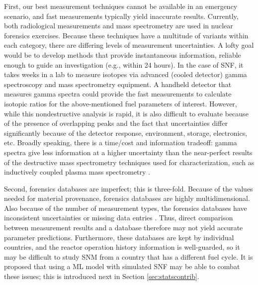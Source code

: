 First, our best measurement techniques cannot be available in an emergency
scenario, and fast measurements typically yield inaccurate results.  Currently,
both radiological measurements and mass spectrometry are used in nuclear
forensics exercises.  Because these techniques have a multitude of variants
within each category, there are differing levels of measurement uncertainties.
A lofty goal would be to develop methods that provide instantaneous
information, reliable enough to guide an investigation (e.g., within 24 hours).
In the case of \gls{SNF}, it takes weeks in a lab to measure isotopes via
advanced (cooled detector) gamma spectroscopy and mass spectrometry equipment.
A handheld detector that measures gamma spectra could provide the fast
measurements to calculate isotopic ratios for the above-mentioned fuel
parameters of interest.  However, while this nondestructive analysis is rapid,
it is also difficult to evaluate because of the presence of overlapping peaks
and the fact that uncertainties differ significantly because of the detector
response, environment, storage, electronics, etc. Broadly speaking, there is a
time/cost and information tradeoff: gamma spectra give less information at a
higher uncertainty than the near-perfect results of the destructive mass
spectrometry techniques used for characterization, such as inductively coupled
plasma mass spectrometry \cite{iaea_nf}.

Second, forensics databases are imperfect; this is three-fold.  Because of the
values needed for material provenance, forensics databases are highly
multidimensional. Also because of the number of measurement types, the
forensics databases have inconsistent uncertainties or missing data entries
\cite{nf_missingdata}.  Thus, direct comparison between measurement results and
a database therefore may not yield accurate parameter predictions.
Furthermore, these databases are kept by individual countries, and the reactor
operation history information is well-guarded, so it may be difficult to study
\gls{SNM} from a country that has a different fuel cycle.  It is proposed that
using a \gls{ML} model with simulated \gls{SNF} may be able to combat
these issues; this is introduced next in Section \ref{sec:statscontrib}. 
